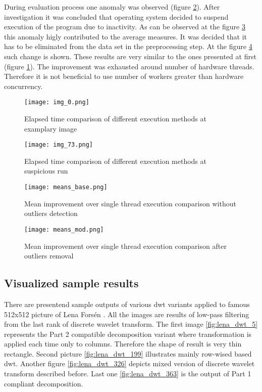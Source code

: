 During evaluation process one anomaly was observed (figure \ref{fig:time_comparison_sus}). After investigation
it was concluded that operating system decided to suspend execution of the program due to inactivity.
As can be observed at the figure \ref{fig:time_comparison_means_base} this anomaly higly contributed
to the average measures. It was decided that it has to be eliminated from the data set in the
preprocessing step. At the figure \ref{fig:time_comparison_means_mod} such change is shown.
These results are very similar to the ones presented at first (figure \ref{fig:time_comparison_example}).
The improvement was exhausted around number of hardware threads. Therefore it is not beneficial to
use number of workers greater than hardware concurrency.

\begin{figure}[!htb]
    \centering
    \texttt{[image: img\_0.png]}
    \caption{Elapsed time comparison of different execution methods at examplary image}
    \label{fig:time_comparison_example}
\end{figure}

\begin{figure}[!htb]
    \centering
    \texttt{[image: img\_73.png]}
    \caption{Elapsed time comparison of different execution methods at suspicious run}
    \label{fig:time_comparison_sus}
\end{figure}

\begin{figure}[!htb]
    \centering
    \texttt{[image: means\_base.png]}
    \caption{Mean improvement over single thread execution comparison without outliers detection}
    \label{fig:time_comparison_means_base}
\end{figure}

\begin{figure}[!htb]
    \centering
    \texttt{[image: means\_mod.png]}
    \caption{Mean improvement over single thread execution comparison after outliers removal}
    \label{fig:time_comparison_means_mod}
\end{figure}

\subsection{Visualized sample results}

There are presentend sample outputs of various dwt variants applied to famous 512x512 picture
of Lena Forsén \cite{lena}. All the images are results of low-pass filtering from the last
rank of discrete wavelet transform. The first image \ref{fig:lena_dwt_5} represents the Part 2
compatible decomposition variant where transformation is applied each time only to columns.
Therefore the shape of result is very thin rectangle. Second picture \ref{fig:lena_dwt_199}
illustrates mainly row-wised based dwt.
Another figure \ref{fig:lena_dwt_326} depicts mixed version of discrete wavelet transform described
before. Last one \ref{fig:lena_dwt_363} is the output of Part 1 compliant decomposition.

